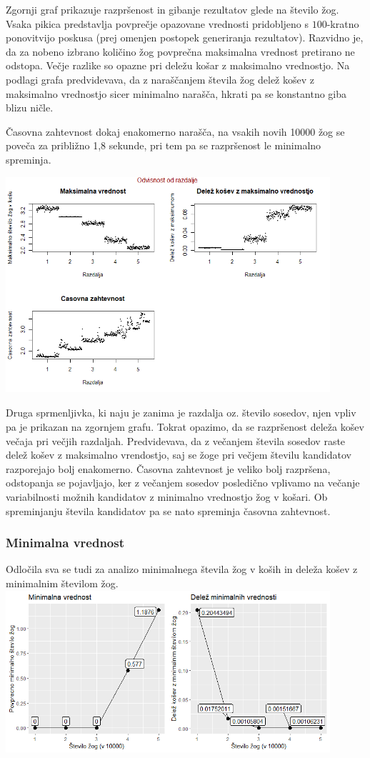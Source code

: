 \documentclass[a4paper, 11pt]{article}
\begin{document}
Zgornji graf prikazuje razpršenost in gibanje rezultatov glede na število žog. Vsaka pikica predstavlja povprečje opazovane vrednosti pridobljeno s $100$-kratno ponovitvijo poskusa (prej omenjen postopek generiranja rezultatov).
Razvidno je, da za nobeno izbrano količino žog povprečna maksimalna vrednost pretirano ne odstopa. Večje razlike so opazne pri deležu košar z maksimalno vrednostjo. Na podlagi grafa predvidevava, da z naraščanjem števila žog delež košev z maksimalno vrednostjo sicer minimalno narašča, hkrati pa se konstantno giba blizu ničle.

Časovna zahtevnost dokaj enakomerno narašča, na vsakih novih 10000 žog se poveča za približno 1,8 sekunde, pri tem pa se razpršenost le minimalno spreminja.
\bigbreak


\includegraphics[width=12cm, height= 8cm]{dim1_glede_na_razdaljo1.png}

Druga sprmenljivka, ki naju je zanima je razdalja oz. število sosedov, njen vpliv pa je prikazan na zgornjem grafu.
Tokrat opazimo, da se razpršenost deleža košev večaja pri večjih razdaljah. Predvidevava, da z večanjem števila sosedov raste delež košev z maksimalno vrendostjo, saj se žoge pri večjem številu kandidatov razporejajo bolj enakomerno.
Časovna zahtevnost je veliko bolj razpršena, odstopanja se pojavljajo, ker z večanjem sosedov posledično vplivamo na večanje variabilnosti možnih kandidatov z minimalno vrednostjo žog v košari. Ob spreminjanju števila kandidatov pa se nato spreminja časovna zahtevnost.
\bigbreak

\subsubsection{Minimalna vrednost}
Odločila sva se tudi za analizo minimalnega števila žog v koših in deleža košev z minimalnim številom žog.
\bigbreak
\includegraphics[width=12cm, height=6cm]{minimum.png}
\end{document}
